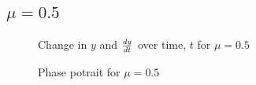 \documentclass{article}
\begin{document}
\subsection{$\mu=0.5$}
\begin{figure}[H]
\centering 
\noindent{}%
\caption{Change in $y$ and $dy \over dt$  over time, $t$ for $\mu=0.5$}
\end{figure}
\begin{figure}[H]
\centering 
\noindent{}%
\caption{Phase potrait for $\mu=0.5$}
\end{figure}
\end{document}
